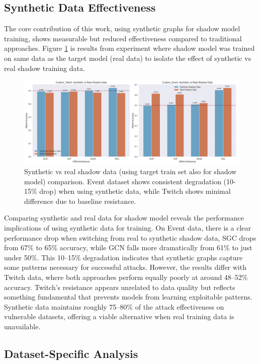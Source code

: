 \documentclass{article}
\begin{document}
\subsection{Synthetic Data Effectiveness}
The core contribution of this work, using synthetic graphs for shadow model training, shows measurable but reduced effectiveness compared to traditional approaches. Figure \ref{fig:synthetic-comparison} is results from experiment where shadow model was trained on same data as the target model (real data) to isolate the effect of synthetic vs real shadow training data.

\begin{figure}[H]
\centering
\includegraphics[width=\textwidth]{../Results/visualizations/synthetic_vs_real_comparison.png}
\caption{Synthetic vs real shadow data (using target train set also for shadow model) comparison. Event dataset shows consistent degradation (10-15\% drop) when using synthetic data, while Twitch shows minimal difference due to baseline resistance.}
\label{fig:synthetic-comparison}
\end{figure}

Comparing synthetic and real data for shadow model reveals the performance implications of using synthetic data for training. On Event data, there is a clear performance drop when switching from real to synthetic shadow data, SGC drops from 67\% to 65\% accuracy, while GCN falls more dramatically from 61\% to just under 50\%. This 10--15\% degradation indicates that synthetic graphs capture some patterns necessary for successful attacks. However, the results differ with Twitch data, where both approaches perform equally poorly at around 48--52\% accuracy. Twitch's resistance appears unrelated to data quality but reflects something fundamental that prevents models from learning exploitable patterns. Synthetic data maintains roughly 75--80\% of the attack effectiveness on vulnerable datasets, offering a viable alternative when real training data is unavailable.

\subsection{Dataset-Specific Analysis}
\end{document}
